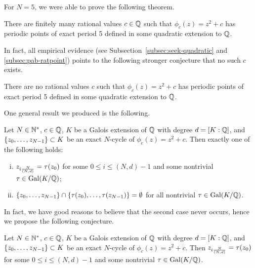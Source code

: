 For $N = 5$, we were able to prove the following theorem.

\begin{theorem}
  \label{th:n=5-finite}
  There are finitely many rational values $c \in \mathbb{Q}$ such that
  $\phi_c(z) = z^2 + c$ has periodic points of exact period 5 defined
  in some quadratic extension to $\mathbb{Q}$.
\end{theorem}

In fact, all empirical evidence (see
Subsection~\ref{subsec:seek-quadratic} and \ref{subsec:pab-ratpoint})
points to the following stronger conjecture that no such $c$ exists.

\begin{conjecture}
  \label{cj:n=5-zero}
  There are no rational values $c$ such that $\phi_c(z) = z^2 + c$ has
  periodic points of exact period 5 defined in some quadratic
  extension to $\mathbb{Q}$.
\end{conjecture}

One general result we produced is the following.

\newcommand{\nd}{\frac{N}{(N, d)}}

\begin{theorem}
  Let $N \in \mathbb{N}^*$, $c \in \mathbb{Q}$, $K$ be a Galois extension of $\mathbb{Q}$ with
  degree $d = [K : \mathbb{Q}]$, and $\left\{z_0, \dots, z_{N-1}\right\} \subset K$ be
  an exact $N$-cycle of $\phi_c(z) = z^2 + c$. Then exactly one of the
  following holds:
  \begin{enumerate}[(i)]
  \item $z_{i\nd} = \t(z_0)$ for some $0 \le i \le (N, d)-1$ and some
    nontrivial $\tau \in \mathrm{Gal}(K/\mathbb{Q})$;

  \item $\left\{z_0, \dots, z_{N-1}\right\} \cap \left\{\tau(z_0), \dots,
      \tau(z_{N-1})\right\} = \emptyset$ for all nontrivial $\tau \in \mathrm{Gal}(K/\mathbb{Q})$.
  \end{enumerate}
\end{theorem}

In fact, we have good reasons to believe that the second case never
occurs, hence we propose the following conjecture.

\begin{conjecture}
  \label{cj:galois-conjugate}
  Let $N \in \mathbb{N}^*$, $c \in \mathbb{Q}$, $K$ be a Galois extension of $\mathbb{Q}$ with
  degree $d = [K : \mathbb{Q}]$, and $\left\{z_0, \dots, z_{N-1}\right\} \subset K$ be
  an exact $N$-cycle of $\phi_c(z) = z^2 + c$. Then $z_{i\nd} =
  \t(z_0)$ for some $0 \le i \le (N, d)-1$ and some nontrivial $\tau \in
  \mathrm{Gal}(K/\mathbb{Q})$.
\end{conjecture}

